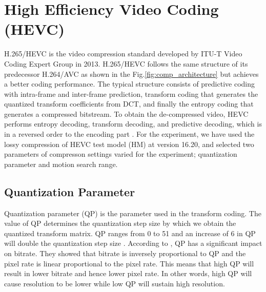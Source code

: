 \section{High Efficiency Video Coding (HEVC)}
\label{sec:background/section_c}

H.265/HEVC is the video compression standard developed by ITU-T Video Coding Expert Group in 2013. H.265/HEVC follows the same structure of its predecessor H.264/AVC as shown in the Fig.\ref{fig:comp_architecture} but achieves a better coding performance. The typical structure consists of predictive coding with intra-frame and inter-frame prediction, transform coding that generates the quantized transform coefficients from DCT, and finally the entropy coding that generates a compressed bitstream. To obtain the de-compressed video, HEVC performs entropy decoding, transform decoding, and predictive decoding, which is in a reversed order to the encoding part \cite{zhang_overview_2019}. For the experiment, we have used the lossy compression of HEVC test model (HM) at version 16.20, and selected two parameters of compresson settings varied for the experiment; quantization parameter and motion search range.

\subsection{Quantization Parameter}
\label{subsec:background/section_c/qp}
Quantization parameter (QP) is the parameter used in the transform coding. The value of QP determines the quantization step size by which we obtain the quantized transform matrix. QP ranges from 0 to 51 and an increase of 6 in QP will double the quantization step size \cite{sullivan_overview_2012} \cite{budagavi_hevc_2014}. According to \cite{sharrab_modeling_2017}, QP has a significant impact on bitrate. They showed that bitrate is inversely proportional to QP and the pixel rate is linear proportional to the pixel rate. This means that high QP will result in lower bitrate and hence lower pixel rate. In other words, high QP will cause resolution to be lower while low QP will sustain high resolution.

